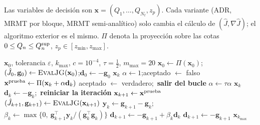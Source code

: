 \documentclass[11pt]{article}
\numberwithin{equation}{section}
\theoremstyle{plain}
\theoremstyle{definition}
\theoremstyle{remark}
\begin{document}
Las variables de decisión son $\mathbf{x}=(Q_1,\dots,Q_{N_t},z_p)$. Cada variante (ADR, MRMT por bloque, MRMT
semi-analítico) solo cambia el cálculo de $(\hat J,\nabla\hat J)$; el algoritmo exterior es el mismo. $\Pi$ denota la proyección sobre las cotas
$0\le Q_n\le Q^{\rm sup}_n$, $z_p\in[z_{\min},z_{\max}]$.

\begin{algorithm}[h]
\caption{Gradiente conjugado no lineal proyectado (Polak--Ribière$^+$, Armijo)}
\label{alg:cg}
\begin{algorithmic}[1]
\Require $\mathbf{x}_0$, tolerancia $\varepsilon$, $k_{\max}$, $c=10^{-4}$, $\tau=\tfrac12$, $m_{\max}=20$
\State $\mathbf{x}_0\gets\Pi(\mathbf{x}_0)$;\quad $(\hat J_0,\mathbf{g}_0)\gets\textsc{EvalJG}(\mathbf{x}_0)$;\quad $\mathbf{d}_0\gets-\mathbf{g}_0$
   \State \Return $\mathbf{x}_k$ \EndIf
  \State $\alpha\gets1$;\quad aceptado $\gets$ falso
   
    \State $\mathbf{x}^{\rm prueba}\gets\Pi(\mathbf{x}_k+\alpha\mathbf{d}_k)$
     \State aceptado $\gets$ verdadero;\ \textbf{salir del bucle} \EndIf
    \State $\alpha\gets\tau\alpha$
  \EndFor
     \State \Return $\mathbf{x}_k$ 
    \Else \State $\mathbf{d}_k\gets-\mathbf{g}_k$;\ \textbf{reiniciar la iteración} \EndIf
  \EndIf
  \State $\mathbf{x}_{k+1}\gets\mathbf{x}^{\rm prueba}$ 
  \State $(\hat J_{k+1},\mathbf{g}_{k+1})\gets\textsc{EvalJG}(\mathbf{x}_{k+1})$
  \State $\mathbf{y}_k\gets\mathbf{g}_{k+1}-\mathbf{g}_k$;\quad
         $\beta_k\gets\max\bigl\{0,\ \mathbf{g}_{k+1}^\top\mathbf{y}_k/(\mathbf{g}_k^\top\mathbf{g}_k)\bigr\}$
  \State $\mathbf{d}_{k+1}\gets-\mathbf{g}_{k+1}+\beta_k\mathbf{d}_k$
   \State $\mathbf{d}_{k+1}\gets-\mathbf{g}_{k+1}$  \EndIf
\EndFor
\State \Return $\mathbf{x}_{k_{\max}}$
\end{algorithmic}
\end{algorithm}
\end{document}
